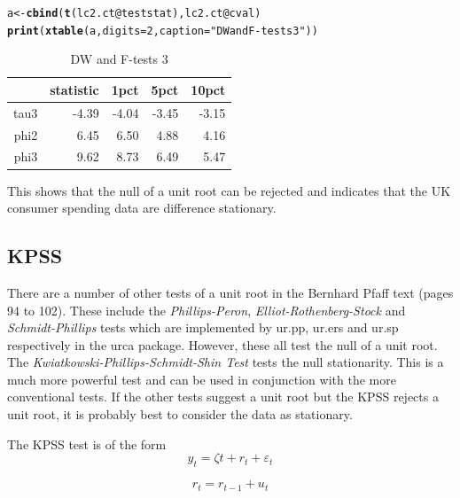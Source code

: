 \documentclass{article}\usepackage{graphicx, color}
\makeatletter
\newcommand{\hlfunctioncall}[1]{\textcolor[rgb]{0.501960784313725,0,0.329411764705882}{\textbf{#1}}}%
\newcommand{\hlstring}[1]{\textcolor[rgb]{0.6,0.6,1}{#1}}%
\newenvironment{kframe}{%
 \def\at@end@of@kframe{}%
 \ifinner\ifhmode%
  \def\at@end@of@kframe{\end{minipage}}%
  \begin{minipage}{\columnwidth}%
 \fi\fi%
 \def\FrameCommand##1{\hskip\@totalleftmargin \hskip-\fboxsep
 \colorbox{shadecolor}{##1}\hskip-\fboxsep
     \hskip-\linewidth \hskip-\@totalleftmargin \hskip\columnwidth}%
 \MakeFramed {\advance\hsize-\width
   \@totalleftmargin\z@ \linewidth\hsize
   \@setminipage}}%
 {\par\unskip\endMakeFramed%
 \at@end@of@kframe}
\makeatother
\begin{document}
\begin{kframe}
\begin{alltt}
a <- \hlfunctioncall{cbind}(\hlfunctioncall{t}(lc2.ct@teststat), lc2.ct@cval)
\hlfunctioncall{print}(\hlfunctioncall{xtable}(a, digits = 2, caption = \hlstring{"DW and F-tests 3"}))
\end{alltt}
\end{kframe}%
\begin{table}[ht]
\begin{center}
\begin{tabular}{rrrrr}
  \hline
 & statistic & 1pct & 5pct & 10pct \\ 
  \hline
tau3 & -4.39 & -4.04 & -3.45 & -3.15 \\ 
  phi2 & 6.45 & 6.50 & 4.88 & 4.16 \\ 
  phi3 & 9.62 & 8.73 & 6.49 & 5.47 \\ 
   \hline
\end{tabular}
\caption{DW and F-tests 3}
\end{center}
\end{table}


This shows that the null of a unit root can be rejected and indicates that the UK consumer spending data are difference stationary.  

\subsection{KPSS}
There are a number of other tests of a unit root in the Bernhard Pfaff text (pages 94 to 102).  These include the \emph{Phillips-Peron}, \emph{Elliot-Rothenberg-Stock} and \emph{Schmidt-Phillips} tests which are implemented by ur.pp, ur.ers and ur.sp respectively in the urca package.  However, these all test the null of a unit root.  The \emph{Kwiatkowski-Phillips-Schmidt-Shin Test} \citep{KPSS} tests the null stationarity.  This is a much more powerful test and can be used in conjunction with the more conventional tests.  If the other tests suggest a unit root but the KPSS rejects a unit root, it is probably best to consider the data as stationary. 

The KPSS test is of the form
\begin{equation}
\label{eq:KPSS}
y_t = \zeta t + r_t + \varepsilon_t
\end{equation}

\begin{equation}
r_t = r_{t-1} + u_t
\end{equation}
\end{document}
